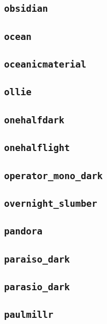 \subsection{\texttt{obsidian}}
\newpage
\subsection{\texttt{ocean}}
\newpage
\subsection{\texttt{oceanicmaterial}}
\newpage
\subsection{\texttt{ollie}}
\newpage
\subsection{\texttt{onehalfdark}}
\newpage
\subsection{\texttt{onehalflight}}
\newpage
\subsection{\texttt{operator\_mono\_dark}}
\newpage
\subsection{\texttt{overnight\_slumber}}
\newpage
\subsection{\texttt{pandora}}
\newpage
\subsection{\texttt{paraiso\_dark}}
\newpage
\subsection{\texttt{parasio\_dark}}
\newpage
\subsection{\texttt{paulmillr}}
\newpage
